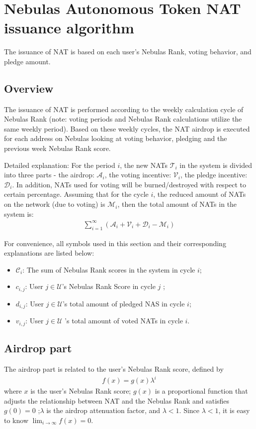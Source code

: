 \section{Nebulas Autonomous Token NAT issuance algorithm}

The issuance of NAT is based on each user's Nebulas Rank, voting behavior, and pledge amount.

\subsection{Overview}
The issuance of NAT is performed according to the weekly calculation cycle of Nebulas Rank (note: voting periods and Nebulas Rank calculations utilize the same weekly period). Based on these weekly cycles, the NAT airdrop is executed for each address on Nebulas looking at voting behavior, pledging and the previous week Nebulas Rank score.

Detailed explanation:
For the period $i$, the new NATs $\mathcal{T}_i$ in the system is divided into three parts - the airdrop: $\mathcal{A}_i$, the voting incentive: $\mathcal{V}_i$, the pledge incentive: $\mathcal{D}_i$.
In addition, NATs used for voting will be burned/destroyed with respect to certain percentage. Assuming that for the cycle $i$, the reduced amount of NATs on the network (due to voting) is $\mathcal{M}_i$, then the total amount of NATs in the system is:
\begin{align}
\sum_{i=1}^{\infty} (\mathcal{A}_i + \mathcal{V}_i + \mathcal{D}_i - \mathcal{M}_i)
\end{align}

For convenience, all symbols used in this section and their corresponding explanations are listed below:
\begin{itemize}
\item $\mathcal{C}_i$: The sum of Nebulas Rank scores in the system in  cycle $i$;
\item $c_{i,j}$: User $j \in \mathcal{U}$'s Nebulas Rank Score in cycle $j$ ;
\item $d_{i,j}$: User $j \in \mathcal{U}$'s total amount of pledged NAS in cycle $i$;
\item $v_{i,j}$: User $j \in \mathcal{U}$ 's total amount of voted NATs in cycle $i$.
\end{itemize}

\subsection{Airdrop part}
The airdrop part is related to the user's Nebulas Rank score, defined by
\begin{align}
    f(x) = g(x)\lambda^i
\end{align}
\noindent where $x$ is the user's Nebulas Rank score; $g(x)$ is a proportional function that adjusts the relationship between NAT and the Nebulas Rank and satisfies $g(0) = 0$ ;$\lambda$ is the airdrop attenuation factor, and $\lambda < 1$.
Since $\lambda < 1$, it is easy to know $\lim_{i\to \infty}f(x) = 0$.

